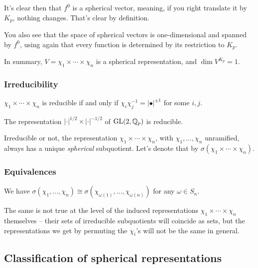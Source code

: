 \documentclass[reqno]{amsart} 
\begin{document}
It's clear then that $f^0$ is a spherical vector, meaning, if you right translate it by $K_p$, nothing changes.  That's clear by definition.

You also see that the space of spherical vectors is one-dimensional and spanned by $f^0$, using again that every function is determined by its restriction to $K_p$.

In summary, $V = \chi_1 \times \dotsb \times \chi_n$ is a spherical representation, and $\dim V^{K_p} = 1$.

\subsubsection{Irreducibility}

\begin{theorem}
  $\chi_1 \times \dotsb \times \chi_n$ is reducible if and only if $\chi_i \chi_j^{-1} = \lvert \bullet \rvert^{\pm 1}$ for some $i, j$.
\end{theorem}
\begin{example}
  The representation  $\lvert \cdot \rvert^{1/2} \times \lvert \cdot  \rvert^{-1/2}$ of $\operatorname{GL}(2,\mathbb{Q}_p)$ is reducible.
\end{example}

Irreducible or not, the representation $\chi_1 \times \dotsb \times \chi_n$, with $\chi_1, \dotsc, \chi_n$ unramified, always has a unique \emph{spherical} subquotient.  Let's denote that by $\sigma(\chi_1 \times \dotsb \times \chi_n)$.

\subsubsection{Equivalences}

\begin{theorem}
  We have $\sigma(\chi_1, \dotsc, \chi_n) \cong \sigma(\chi_{\omega(1)}, \dotsc, \chi_{\omega(n)})$ for any $\omega \in S_n$.
\end{theorem}

\begin{remark}
  The same is not true at the level of the induced representations $\chi_1 \times \dotsb \times \chi_n$ themselves -- their sets of irreducible subquotients will coincide as sets, but the representations we get by permuting the $\chi_i$'s will not be the same in general.
\end{remark}

\subsection{Classification of spherical representations}
\end{document}
